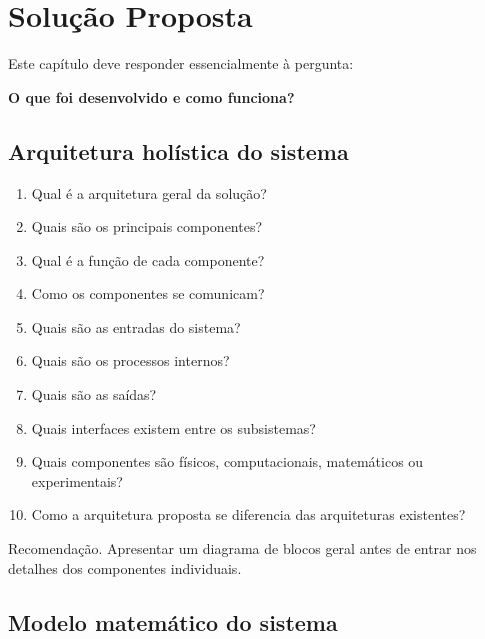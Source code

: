\chapter{Solução Proposta}

Este capítulo deve responder essencialmente à pergunta:

\begin{center}
	\textbf{O que foi desenvolvido e como funciona?}
\end{center}

\section{Arquitetura holística do sistema}

\begin{enumerate}
	\item Qual é a arquitetura geral da solução?
	\item Quais são os principais componentes?
	\item Qual é a função de cada componente?
	\item Como os componentes se comunicam?
	\item Quais são as entradas do sistema?
	\item Quais são os processos internos?
	\item Quais são as saídas?
	\item Quais interfaces existem entre os subsistemas?
	\item Quais componentes são físicos, computacionais, matemáticos ou experimentais?
	\item Como a arquitetura proposta se diferencia das arquiteturas existentes?
\end{enumerate}

{Recomendação.}
Apresentar um diagrama de blocos geral antes de entrar nos detalhes dos
componentes individuais.

\section{Modelo matemático do sistema}

